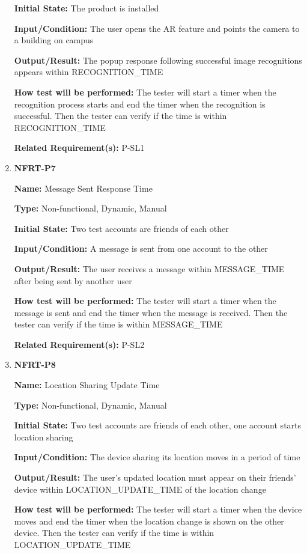\documentclass[12pt, titlepage]{article}
\begin{document}
\begin{enumerate}
\textbf{Initial State:} The product is installed

\textbf{Input/Condition:} The user opens the AR feature and points the camera to a building on campus

\textbf{Output/Result:} The popup response following successful image recognitions appears within RECOGNITION\_TIME

\textbf{How test will be performed:} The tester will start a timer when the recognition process starts and end the timer when the recognition is successful. Then the tester can verify if the time is within RECOGNITION\_TIME

\textbf{Related Requirement(s):} P-SL1

\item{\textbf{NFRT-P7}}

\textbf{Name:} Message Sent Response Time

\textbf{Type:} Non-functional, Dynamic, Manual
					
\textbf{Initial State:} Two test accounts are friends of each other

\textbf{Input/Condition:} A message is sent from one account to the other

\textbf{Output/Result:} The user receives a message within MESSAGE\_TIME after being sent by another user

\textbf{How test will be performed:} The tester will start a timer when the message is sent and end the timer when the message is received. Then the tester can verify if the time is within MESSAGE\_TIME

\textbf{Related Requirement(s):} P-SL2

\item{\textbf{NFRT-P8}}

\textbf{Name:} Location Sharing Update Time

\textbf{Type:} Non-functional, Dynamic, Manual
					
\textbf{Initial State:} Two test accounts are friends of each other, one account starts location sharing

\textbf{Input/Condition:} The device sharing its location moves in a period of time

\textbf{Output/Result:} The user's updated location must appear on their friends' device within LOCATION\_UPDATE\_TIME of the location change

\textbf{How test will be performed:} The tester will start a timer when the device moves and end the timer when the location change is shown on the other device. Then the tester can verify if the time is within LOCATION\_UPDATE\_TIME


\end{enumerate}
\end{document}
